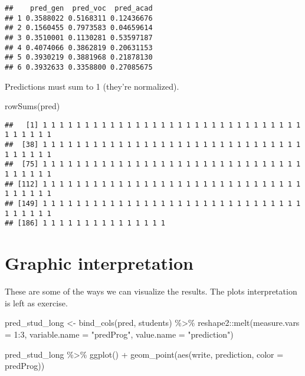 \documentclass[
  oneside]{book}
\newenvironment{Shaded}{\begin{snugshade}}{\end{snugshade}}
\newcommand{\AttributeTok}[1]{\textcolor[rgb]{0.77,0.63,0.00}{#1}}
\newcommand{\DecValTok}[1]{\textcolor[rgb]{0.00,0.00,0.81}{#1}}
\newcommand{\FunctionTok}[1]{\textcolor[rgb]{0.00,0.00,0.00}{#1}}
\newcommand{\NormalTok}[1]{#1}
\newcommand{\OtherTok}[1]{\textcolor[rgb]{0.56,0.35,0.01}{#1}}
\newcommand{\SpecialCharTok}[1]{\textcolor[rgb]{0.00,0.00,0.00}{#1}}
\newcommand{\StringTok}[1]{\textcolor[rgb]{0.31,0.60,0.02}{#1}}
\begin{document}
\begin{verbatim}
##    pred_gen  pred_voc  pred_acad
## 1 0.3588022 0.5168311 0.12436676
## 2 0.1560455 0.7973583 0.04659614
## 3 0.3510001 0.1130281 0.53597187
## 4 0.4074066 0.3862819 0.20631153
## 5 0.3930219 0.3881968 0.21878130
## 6 0.3932633 0.3358800 0.27085675
\end{verbatim}

Predictions must sum to 1 (they're normalized).

\begin{Shaded}
\begin{Highlighting}[]
\FunctionTok{rowSums}\NormalTok{(pred)}
\end{Highlighting}
\end{Shaded}

\begin{verbatim}
##   [1] 1 1 1 1 1 1 1 1 1 1 1 1 1 1 1 1 1 1 1 1 1 1 1 1 1 1 1 1 1 1 1 1 1 1 1 1 1
##  [38] 1 1 1 1 1 1 1 1 1 1 1 1 1 1 1 1 1 1 1 1 1 1 1 1 1 1 1 1 1 1 1 1 1 1 1 1 1
##  [75] 1 1 1 1 1 1 1 1 1 1 1 1 1 1 1 1 1 1 1 1 1 1 1 1 1 1 1 1 1 1 1 1 1 1 1 1 1
## [112] 1 1 1 1 1 1 1 1 1 1 1 1 1 1 1 1 1 1 1 1 1 1 1 1 1 1 1 1 1 1 1 1 1 1 1 1 1
## [149] 1 1 1 1 1 1 1 1 1 1 1 1 1 1 1 1 1 1 1 1 1 1 1 1 1 1 1 1 1 1 1 1 1 1 1 1 1
## [186] 1 1 1 1 1 1 1 1 1 1 1 1 1 1 1
\end{verbatim}

\hypertarget{graphic-interpretation}{%
\section{Graphic interpretation}\label{graphic-interpretation}}

These are some of the ways we can visualize the results.
The plots interpretation is left as exercise.

\begin{Shaded}
\begin{Highlighting}[]
\NormalTok{pred\_stud\_long }\OtherTok{\textless{}{-}} \FunctionTok{bind\_cols}\NormalTok{(pred, students) }\SpecialCharTok{\%\textgreater{}\%}
\NormalTok{  reshape2}\SpecialCharTok{::}\FunctionTok{melt}\NormalTok{(}\AttributeTok{measure.vars =} \DecValTok{1}\SpecialCharTok{:}\DecValTok{3}\NormalTok{,}
       \AttributeTok{variable.name =} \StringTok{"predProg"}\NormalTok{,}
       \AttributeTok{value.name =} \StringTok{"prediction"}\NormalTok{)}

\NormalTok{pred\_stud\_long }\SpecialCharTok{\%\textgreater{}\%}
  \FunctionTok{ggplot}\NormalTok{() }\SpecialCharTok{+}
  \FunctionTok{geom\_point}\NormalTok{(}\FunctionTok{aes}\NormalTok{(write, prediction, }\AttributeTok{color =}\NormalTok{ predProg))}
\end{Highlighting}
\end{Shaded}
\end{document}

